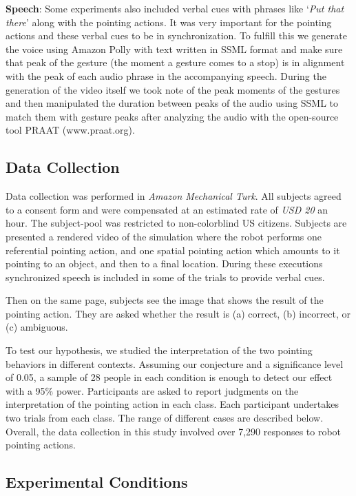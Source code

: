 

\noindent\textbf{Speech}: Some experiments also included verbal cues with phrases like `\textit{Put that there}' along with the pointing actions. It was very important for the pointing actions and these verbal cues to be in synchronization. To fulfill this we generate the voice using Amazon Polly with text written in SSML format and make sure that peak of the gesture (the moment a gesture comes to a stop) is in alignment with the peak of each audio phrase in the accompanying speech. During the generation of the video itself we took note of the peak moments of the gestures and then manipulated the duration between peaks of the audio using SSML to match them with gesture peaks after analyzing the audio with the open-source tool PRAAT (www.praat.org).

\subsection{Data Collection}

Data collection was performed in \textit{Amazon Mechanical Turk}. All subjects agreed to a consent form and were compensated at an estimated rate of \textit{USD 20} an hour. The subject-pool was restricted to non-colorblind US citizens. Subjects are presented a rendered video of the simulation where the robot performs one referential pointing action, and one spatial pointing action which amounts to it pointing to an object, and then to a final location. During these executions synchronized speech is included in some of the trials to provide verbal cues.

Then on the same page, subjects see the image that shows the result of the pointing action. They are asked whether the result is (a) correct, (b) incorrect, or (c) ambiguous.  

To test our hypothesis, we studied the interpretation of the two pointing behaviors in different contexts. Assuming our conjecture and a significance level of 0.05, a sample of 28 people in each condition is enough to detect our effect with a 95\% power.  Participants are asked to report judgments on the interpretation of the pointing action in each class.  Each participant undertakes two trials from each class.  The range of different cases are described below.  Overall, the data collection in this study involved over 7,290 responses to robot pointing actions.

\subsection{Experimental Conditions}

